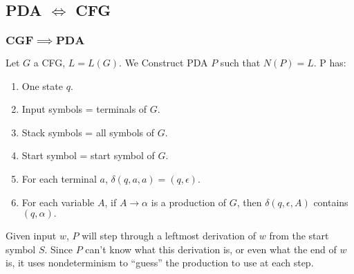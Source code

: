 \subsection{\color{ForestGreen}PDA $\iff$ CFG}
\subsubsection{$\mathbf{CGF \implies PDA}$}
Let $G$ a CFG, $L = L(G).$ We Construct PDA $P$ such that $N(P) = L.$ P has:
    \begin{enumerate}
        \item One state $q$.
        \item Input symbols = terminals of $G$.
        \item Stack symbols = all symbols of $G$.
        \item Start symbol = start symbol of $G$.
        \item For each terminal $a$, $\delta (q, a, a) = (q, \epsilon).$ 
        \item For each variable $A$, if $A \rightarrow \alpha $ is a production of $G$, then $\delta (q, \epsilon, A) $ contains $(q, \alpha).$
    \end{enumerate}
    Given input $w$, $P$ will step through a leftmost derivation of $w$ from the start symbol $S$. Since $P$ can’t know what this derivation is, or even what the end of $w$ is, it uses nondeterminism to “guess” the production to use at each step.
